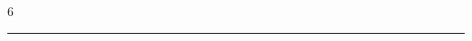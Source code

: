 \documentclass[landscape]{article}
\begin{document}
\begin{multicols*}{6}

\noindent\textcolor{red}{\rule{\linewidth}{1pt}}

\end{multicols*}
\end{document}
